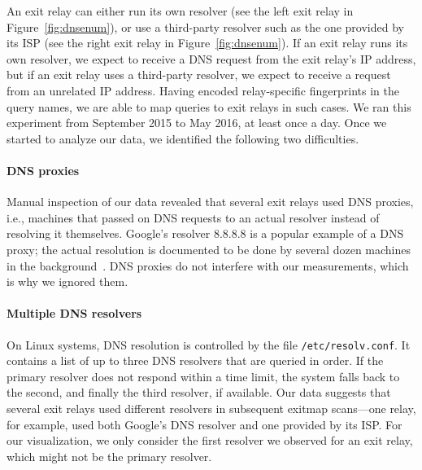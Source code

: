 An exit relay can either run its own resolver (see the left exit relay in
Figure~\ref{fig:dnsenum}), or use a third-party resolver such as the one
provided by its ISP (see the right exit relay in Figure~\ref{fig:dnsenum}).  If
an exit relay runs its own resolver, we expect to receive a DNS request from
the exit relay's IP address, but if an exit relay uses a third-party resolver,
we expect to receive a request from an unrelated IP address.  Having encoded
relay-specific fingerprints in the query names, we are able to map queries to
exit relays in such cases.  We ran this experiment from September 2015 to May
2016, at least once a day.  Once we started to analyze our data, we identified
the following two difficulties.

\paragraph{DNS proxies}
Manual inspection of our data revealed that several exit relays used DNS
proxies, i.e., machines that passed on DNS requests to an actual resolver
instead of resolving it themselves.  Google's resolver 8.8.8.8 is a popular
example of a DNS proxy; the actual resolution is documented to be done by
several dozen machines in the background~\cite{google-proxies}.  DNS proxies do
not interfere with our measurements, which is why we ignored them.

\paragraph{Multiple DNS resolvers}
On Linux systems, DNS resolution is controlled by the file
\texttt{/etc/resolv.conf}.  It contains a list of up to three DNS resolvers
that are queried in order.  If the primary resolver does not respond within a
time limit, the system falls back to the second, and finally the third
resolver, if available.  Our data suggests that several exit relays used
different resolvers in subsequent exitmap scans---one relay, for example, used
both Google's DNS resolver and one provided by its ISP.  For our visualization,
we only consider the first resolver we observed for an exit relay, which might
not be the primary resolver.  

